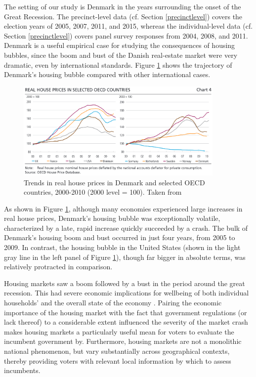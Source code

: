 \documentclass[12pt,a4paper]{article}
\begin{document}
The setting of our study is Denmark in the years surrounding the onset of the Great Recession. The precinct-level data (cf. Section \ref{precinctlevel}) covers the election years of 2005, 2007, 2011, and 2015, whereas the individual-level data (cf. Section \ref{precinctlevel}) covers panel survey responses from 2004, 2008, and 2011. Denmark is a useful empirical case for studying the consequences of housing bubbles, since the boom and bust of the Danish real-estate market were very dramatic, even by international standards. Figure \ref{dam} shows the trajectory of Denmark's housing bubble compared with other international cases.

\begin{figure}[htbp!]
	\includegraphics[width=0.9\textwidth]{../figures/intcomparison}
	\centering
	\caption{ Trends in real house prices in Denmark and selected OECD countries, 2000-2010 (2000 level = 100).  Taken from \citet[p. 50]{dam2011housing}}\label{dam}
\end{figure}

As shown in Figure \ref{dam}, although many economies experienced large increases in real house prices, Denmark's housing bubble was exceptionally volatile, characterized by a late, rapid increase quickly succeeded by a crash. The bulk of Denmark's housing boom and bust occurred in just four years, from 2005 to 2009. In contrast, the housing bubble in the United States (shown in the light gray line in the left panel of Figure \ref{dam}), though far bigger in absolute terms, was relatively protracted in comparison.

Housing markets saw a boom followed by a bust in the period around the great recession. This had severe economic implications for wellbeing of both individual households’ and the overall state of the economy \citep{dam2011housing,ansell2014political}. Pairing the economic importance of the housing market with the fact that government regulations (or lack thereof) to a considerable extent influenced the severity of the market crash makes housing markets a particularly useful mean for voters to evaluate the incumbent government by. Furthermore, housing markets are not a monolithic national phenomenon, but vary substantially across geographical contexts, thereby providing voters with relevant local information by which to assess incumbents. 
\end{document}
